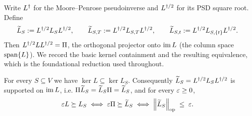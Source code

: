 Write $L^{\dagger}$ for the Moore--Penrose pseudoinverse and $L^{\dagger/2}$ for its PSD square
root. Define
\[
  \widetilde{L}_S      := L^{\dagger/2} L_S L^{\dagger/2}, \qquad
  \widetilde{L}_{S,T}  := L^{\dagger/2} L_{S,T}  L^{\dagger/2}, \qquad
  \widetilde{L}_{S,t}  := L^{\dagger/2} L_{S,\{t\}}L^{\dagger/2}.
\]
Then $L^{\dagger/2} L L^{\dagger/2} = \Pi$, the orthogonal projector onto $\operatorname{im} L$
(the column space $\operatorname{span}\{L\}$). We record the basic kernel containment and
the resulting equivalence, which is the foundational reduction used throughout.

\begin{qsixlemma}\label{lem:opnorm-form}
For every $S\subseteq V$ we have $\ker L\subseteq\ker L_S$. Consequently
$\widetilde{L}_S=L^{\dagger/2} L_SL^{\dagger/2}$ is supported on $\operatorname{im} L$, i.e.
$\Pi\widetilde{L}_S=\widetilde{L}_S\Pi=\widetilde{L}_S$, and for every $\varepsilon\ge 0$,
\begin{equation}\label{eq:opnorm-form}
  \varepsilon L\succeq L_S
  \;\Longleftrightarrow\;
  \varepsilon\Pi\succeq\widetilde{L}_S
  \;\Longleftrightarrow\;
  \left\lVert \widetilde{L}_S \right\rVert_{\mathrm{op}} \;\le\; \varepsilon.
\end{equation}
\end{qsixlemma}

